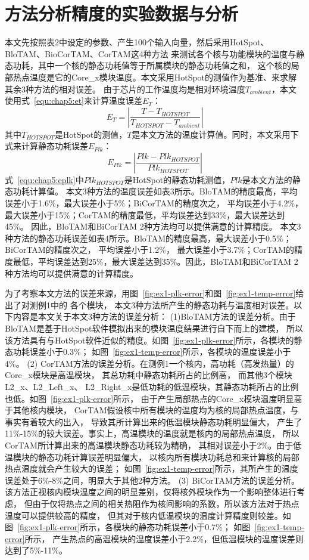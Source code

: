 \section{方法分析精度的实验数据与分析}
本文先按照表2中设定的参数、产生100个输入向量，然后采用HotSpot、BloTAM、BioCorTAM、CorTAM这4种方法 来测试各个核与功能模块的温度与静态功耗，其中一个核的静态功耗值等于所属模块的静态功耗值之和， 这个核的局部热点温度是它的Core\_x模块温度。本文采用HotSpot的测值作为基准、来求解其余3种方法的相对误差。 由于芯片的工作温度均是相对环境温度$T_{ambient}$，本文使用式~\ref{equ:chap5:et}来计算温度误差$E_T$：
\begin{equation}
\label{equ:chap5:et}
E_T = |\frac{T-T_{HOTSPOT}}{T_{HOTSPOT}-T_{ambient}}|
\end{equation}
其中$T_{HOTSPOT}$是HotSpot的测值，$T$是本文方法的温度计算值。同时，本文采用下式来计算静态功耗误差$E_{Plk}$：
\begin{equation}
\label{equ:chap5:eplk}
E_{Plk} = |\frac{Plk-Plk_{HOTSPOT}}{Plk_{HOTSPOT}}|
\end{equation}
式~\ref{equ:chap5:eplk}中$Plk_{HOTSPOT}$是HotSpot的静态功耗测值，$Plk$是本文方法的静态功耗计算值。
本文3种方法的温度误差如表3所示。BloTAM的精度最高，平均误差小于1.6\%，最大误差小于5\%；BiCorTAM的精度次之， 平均误差小于4.2\%，最大误差小于15\%；CorTAM的精度最低，平均误差达到33\%，最大误差达到45\%。 因此，BloTAM和BiCorTAM 2种方法均可以提供满意的计算精度。
本文3种方法的静态功耗误差如表4所示。BloTAM的精度最高，最大误差小于0.5\%；BiCorTAM的精度次之， 平均误差小于1.2\%， 最大误差小于3.7\%；CorTAM的精度最低，平均误差达到25\%，最大误差达到35\%。因此，BloTAM和BiCorTAM 2种方法均可以提供满意的计算精度。

为了考察本文方法的误差来源，用图~\ref{fig:ex1-plk-error}和图~\ref{fig:ex1-temp-error}给出了对测例1中的 各个模块， 本文3种方法所产生的静态功耗与温度相对误差。以下内容是本文关于本文3种方法的误差分析：
(1)BloTAM方法的误差分析。由于BloTAM是基于HotSpot软件模拟出来的模块温度结果进行自下而上的建模， 所以该方法具有与HotSpot软件近似的精度。如图~\ref{fig:ex1-plk-error}所示，各模块的静态功耗误差小于0.3\%； 如图~\ref{fig:ex1-temp-error}所示，各模块的温度误差小于4\%。
(2) CorTAM方法的误差分析。在测例1一个核内，高功耗（高发热量）的Core\_x模块是高温模块， 其总功耗中静态功耗所占的比例高， 而其他3个模块L2\_x、L2\_Left\_x、 L2\_Right\_x是低功耗的低温模块，其静态功耗所占的比例也低。如图~\ref{fig:ex1-plk-error}所示， 由于产生局部热点的Core\_x模块温度明显高于其他核内模块， CorTAM假设核中所有模块的温度均为核的局部热点温度，与事实有着较大的出入， 导致其所计算出来的低温模块静态功耗明显偏大， 产生了11\%-15\%的较大误差。事实上，高温模块的温度就是核内的局部热点温度， 所以CorTAM所计算出来的高温模块静态功耗较为精确， 其相对误差小于2\%。由于低温模块的静态功耗计算误差明显偏大， 以核内所有模块功耗总和来计算核的局部热点温度就会产生较大的误差； 如图~\ref{fig:ex1-temp-error}所示，其所产生的温度误差处于6\%-8\%之间，明显大于其他2种方法。
(3) BiCorTAM方法的误差分析。该方法正视核内模块温度之间的明显差别，仅将核外模块作为一个影响整体进行考虑， 但由于仅将热点之间的相关热阻作为核间影响的系数，所以该方法对于热点温度可以提供较高的精度， 但其对于核内低温模块的温度计算精度则较差。如图~\ref{fig:ex1-plk-error}所示，各模块的静态功耗误差小于0.7\%； 如图~\ref{fig:ex1-temp-error}所示， 产生热点的高温模块的温度误差小于2.2\%，但低温模块的温度误差则达到了5\%-11\%。

